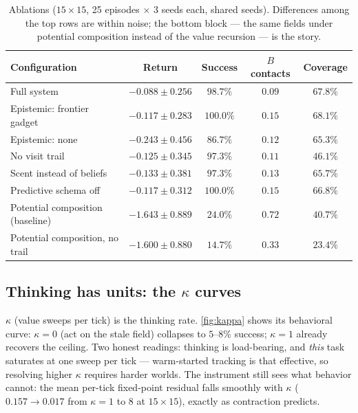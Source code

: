 \documentclass[11pt]{article}
\begin{document}
\begin{table}[t]
\centering
\caption{Ablations ($15{\times}15$, 25 episodes $\times$ 3 seeds each, shared seeds). Differences among the top rows are within noise; the bottom block --- the same fields under potential composition instead of the value recursion --- is the story.}
\label{tab:ablations}
\begin{tabular}{lcccc}
\toprule
Configuration & Return & Success & $B$ contacts & Coverage \\
\midrule
Full system & $-0.088 \pm 0.256$ & $98.7\%$ & $0.09$ & $67.8\%$ \\
Epistemic: frontier gadget & $-0.117 \pm 0.283$ & $100.0\%$ & $0.15$ & $68.1\%$ \\
Epistemic: none & $-0.243 \pm 0.456$ & $86.7\%$ & $0.12$ & $65.3\%$ \\
No visit trail & $-0.125 \pm 0.345$ & $97.3\%$ & $0.11$ & $46.1\%$ \\
Scent instead of beliefs & $-0.133 \pm 0.381$ & $97.3\%$ & $0.13$ & $65.7\%$ \\
Predictive schema off & $-0.117 \pm 0.312$ & $100.0\%$ & $0.15$ & $66.8\%$ \\
\midrule
Potential composition (baseline) & $-1.643 \pm 0.889$ & $24.0\%$ & $0.72$ & $40.7\%$ \\
Potential composition, no trail & $-1.600 \pm 0.880$ & $14.7\%$ & $0.33$ & $23.4\%$ \\
\bottomrule
\end{tabular}
\end{table}

\subsection{Thinking has units: the $\kappa$ curves}
\label{sec:kappa}
$\kappa$ (value sweeps per tick) is the thinking rate. \cref{fig:kappa} shows its behavioral curve: $\kappa{=}0$ (act on the stale field) collapses to $5$--$8\%$ success; $\kappa{=}1$ already recovers the ceiling. Two honest readings: thinking is load-bearing, and \emph{this} task saturates at one sweep per tick --- warm-started tracking is that effective, so resolving higher $\kappa$ requires harder worlds. The instrument still sees what behavior cannot: the mean per-tick fixed-point residual falls smoothly with $\kappa$ ($0.157 \to 0.017$ from $\kappa{=}1$ to $8$ at $15{\times}15$), exactly as contraction predicts.
\end{document}
